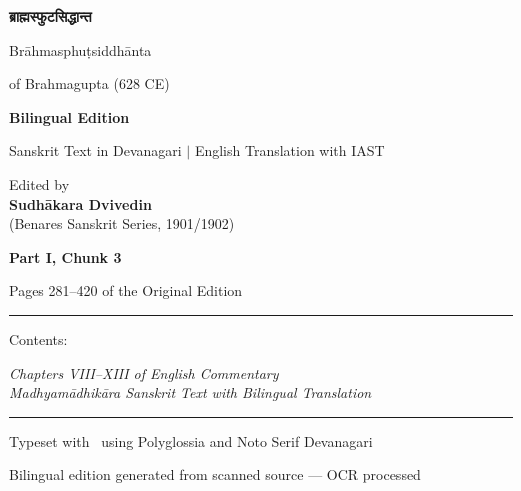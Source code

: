 \documentclass[11pt,a4paper]{article}
\newcommand{\shortline}{\noindent\rule{0.5\textwidth}{0.4pt}\par}
\newcommand{\dev}[1]{{\devanagarifont #1}}
\theoremstyle{definition}
\begin{document}
\begin{titlepage}
\centering
\vspace*{1.5cm}

{\color{titlecolor}\Huge\bfseries\dev{ब्राह्मस्फुटसिद्धान्त}}

\vspace{0.4cm}
{\Large\color{sectioncolor} Br\=ahmasphu\d{t}siddh\=anta}

\vspace{0.3cm}
{\large\color{sectioncolor} of Brahmagupta (628 CE)}

\vspace{1.5cm}
{\LARGE\bfseries Bilingual Edition}

\vspace{0.5cm}
{\large Sanskrit Text in Devanagari $\vert$ English Translation with IAST}

\vspace{2cm}
{\large Edited by\\[0.3cm]
\textbf{Sudh\=akara Dvivedin}\\[0.2cm]
(Benares Sanskrit Series, 1901/1902)}

\vspace{1.5cm}
{\Large\bfseries\color{sectioncolor} Part I, Chunk 3}

\vspace{0.3cm}
{\large Pages 281--420 of the Original Edition}

\vspace{0.5cm}
\shortline

\vspace{0.4cm}
{\normalsize Contents:}

\vspace{0.3cm}
\begin{minipage}{0.85\textwidth}
\centering
\textit{Chapters VIII--XIII of English Commentary}\\[0.15cm]
\textit{Madhyam\=adhik\=ara Sanskrit Text with Bilingual Translation}
\end{minipage}

\vspace{0.5cm}
\shortline

\vspace{0.4cm}
{\small Typeset with \XeLaTeX\ using Polyglossia and Noto Serif Devanagari}

\vfill
{\small Bilingual edition generated from scanned source --- OCR processed}

\end{titlepage}
\end{document}
